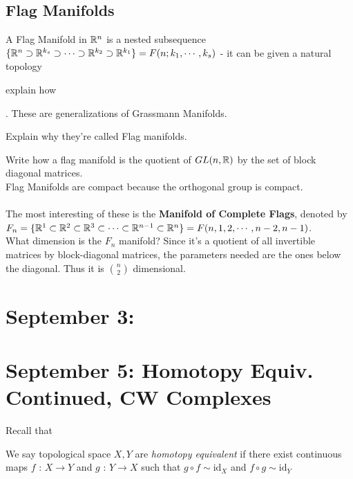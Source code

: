 \documentclass[11pt]{article}
\begin{document}
\subsection{Flag Manifolds}
A Flag Manifold in $\mathbb{R}^n$ is a nested subsequence $\{\mathbb{R}^n \supset \mathbb{R}^{k_s} \supset \cdots \supset \mathbb{R}^{k_2} \supset \mathbb{R}^{k_1}\} = F(n; k_1, \cdots, k_s)$ - it can be given a natural topology \begin{note}
{explain how} \end{note}. These are generalizations of Grassmann Manifolds. \begin{note}
  {Explain why they're called Flag manifolds.}
\end{note}
Write how a flag manifold is the quotient of $GL(n, \mathbb{R})$ by the set of block diagonal matrices.
\\
Flag Manifolds are compact because the orthogonal group is compact.
\\
\\
The most interesting of these is the \textbf{Manifold of Complete Flags}, denoted by $F_n = \{\mathbb{R}^1 \subset \mathbb{R}^2 \subset \mathbb{R}^3 \subset \cdots \subset \mathbb{R}^{n-1} \subset \mathbb{R}^n \} = F(n, 1, 2, \cdots, n-2, n-1)$.
\\
What dimension is the $F_n$ manifold?
Since it's a quotient of all invertible matrices by block-diagonal matrices, the parameters needed are the ones below the diagonal. Thus it is $\binom{n}{2}$ dimensional.

\newpage
\section{September 3:}



\newpage
\section{September 5: Homotopy Equiv. Continued, CW Complexes}

Recall that 
\begin{definition}
  We say topological space $X, Y$ are \emph{homotopy equivalent} if there exist continuous maps $f \text{ : } X \rightarrow Y$ and $g \text{ : } Y \rightarrow X$ such that $g \circ f \sim \mathrm{id}_X$ and $f \circ g \sim \mathrm{id}_Y$
\end{definition}
\end{document}
